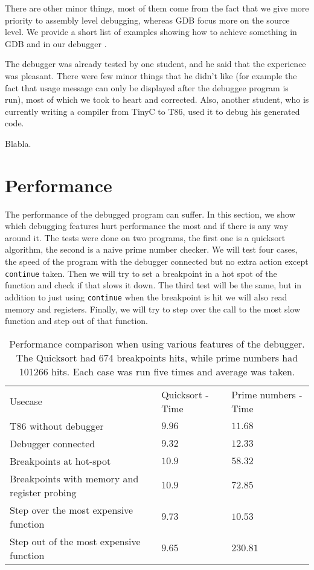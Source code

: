 There are other minor things, most of them come from the fact that we give more
priority to assembly level debugging, whereas GDB focus more on the source
level. We provide a short list of examples showing how to achieve something in
GDB and in our debugger .

The debugger was already tested by one student, and he said that the experience
was pleasant. There were few minor things that he didn't like (for example the
fact that usage message can only be displayed after the debuggee program is
run), most of which we took to heart and corrected. Also, another student, who
is currently writing a compiler from TinyC to T86, used it to debug his
generated code.

Blabla.

\section{Performance}
The performance of the debugged program can suffer. In this section, we show
which debugging features hurt performance the most and if there is any way
around it. The tests were done on two programs, the first one is a quicksort
algorithm, the second is a naive prime number checker. We will test four cases,
the speed of the program with the debugger connected but no extra action except
\texttt{continue} taken. Then we will try to set a breakpoint in a hot spot of
the function and check if that slows it down. The third test will be the same,
but in addition to just using \texttt{continue} when the breakpoint is hit we
will also read memory and registers. Finally, we will try to step over the call
to the most slow function and step out of that function.

\begin{table}[]
\begin{tabular}{lll}
Usecase                                      & Quicksort - Time & Prime numbers - Time \\
T86 without debugger                         & $9.96$            & $11.68$             \\
Debugger connected                           & $9.32$            & $12.33$             \\
Breakpoints at hot-spot                      & $10.9$            & $58.32$             \\
Breakpoints with memory and register probing & $10.9$            & $72.85$             \\
Step over the most expensive function        & $9.73$            & $10.53$             \\
Step out of the most expensive function      & $9.65$            & $230.81$            \\
\end{tabular}
\caption{Performance comparison when using various features of the debugger.
The Quicksort had 674 breakpoints hits, while prime numbers had 101266 hits.
Each case was run five times and average was taken.}
\label{table:benchmark}
\end{table}

